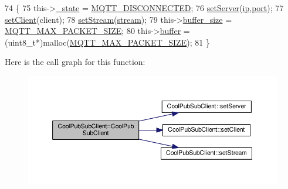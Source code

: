 \begin{DoxyCode}
74                                                                                              \{
75     this->\hyperlink{class_cool_pub_sub_client_aa1953b601206252a30efa5b114eb3e1a}{\_state} = \hyperlink{_cool_pub_sub_client_8h_adaf86a906a305dd129164982d50111b3}{MQTT\_DISCONNECTED};
76     \hyperlink{class_cool_pub_sub_client_a947e70c394c66c7d08d0c53caf8425e3}{setServer}(\hyperlink{class_cool_pub_sub_client_adabd958c6c3462433a3f3393f40a0966}{ip},\hyperlink{class_cool_pub_sub_client_a01e3249102c057756af7a515c179844e}{port});
77     \hyperlink{class_cool_pub_sub_client_a7ee119b786010561ab6a9afa0798e91d}{setClient}(client);
78     \hyperlink{class_cool_pub_sub_client_ae97e40823ea689ff9e36d5bdd71bb933}{setStream}(\hyperlink{class_cool_pub_sub_client_a7a92417b317e7bd9502ed37752111705}{stream});
79     this->\hyperlink{class_cool_pub_sub_client_ae6cb10e42c057483d53516ac830ab526}{buffer\_size} = \hyperlink{_cool_pub_sub_client_8h_ae09b594688a59f1427c7e45259e039b9}{MQTT\_MAX\_PACKET\_SIZE};
80     this->\hyperlink{class_cool_pub_sub_client_a7e8bcc6096626916046a51bebadc7851}{buffer} = (uint8\_t*)malloc(\hyperlink{_cool_pub_sub_client_8h_ae09b594688a59f1427c7e45259e039b9}{MQTT\_MAX\_PACKET\_SIZE});
81 \}
\end{DoxyCode}
Here is the call graph for this function\+:\nopagebreak
\begin{figure}[H]
\begin{center}
\leavevmode
\includegraphics[width=350pt]{d8/d4b/class_cool_pub_sub_client_a3e7d7fa4b55e36f0ac8912335993d650_cgraph}
\end{center}
\end{figure}
\mbox{\label{class_cool_pub_sub_client_afc703702b40ba925377d0b9cd401319e}} 
